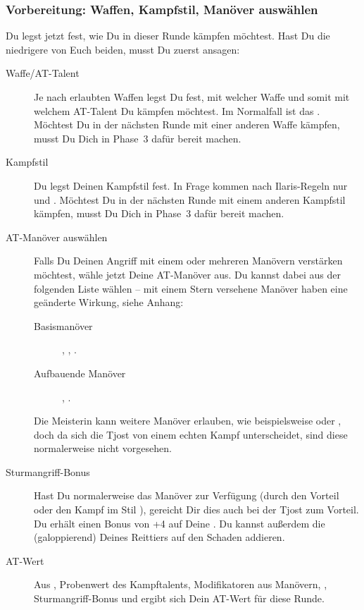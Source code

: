 \documentclass[12pt,div=calc,a5paper,parskip=half]{scrartcl}
\begin{document}
\subsubsection{Vorbereitung: Waffen, Kampfstil, Manöver auswählen}
Du legst jetzt fest, wie Du in dieser Runde kämpfen möchtest. Hast Du die niedrigere  von Euch beiden, musst Du zuerst ansagen: 
\begin{description}
    \item[Waffe/AT-Talent] Je nach erlaubten Waffen legst Du fest, mit welcher Waffe und somit mit welchem AT-Talent Du kämpfen möchtest. Im Normalfall ist das . Möchtest Du in der nächsten Runde mit einer anderen Waffe kämpfen, musst Du Dich in Phase~3 dafür bereit machen. 
    \item[Kampfstil] Du legst Deinen Kampfstil fest. In Frage kommen nach Ilaris-Regeln nur  und . Möchtest Du in der nächsten Runde mit einem anderen Kampfstil kämpfen, musst Du Dich in Phase~3 dafür bereit machen.
    \item[AT-Manöver auswählen] Falls Du Deinen Angriff mit einem oder mehreren Manövern verstärken möchtest, wähle jetzt Deine AT-Manöver aus. Du kannst dabei aus der folgenden Liste wählen -- mit einem Stern versehene Manöver haben eine geänderte Wirkung, siehe Anhang: 
    \begin{description}
        \item[Basismanöver] , , .  
        \item[Aufbauende Manöver] , .
    \end{description}
    Die Meisterin kann weitere Manöver erlauben, wie beispielsweise  oder , doch da sich die Tjost von einem echten Kampf unterscheidet, sind diese normalerweise nicht vorgesehen.  
    \item[Sturmangriff-Bonus] Hast Du normalerweise das Manöver  zur Verfügung (durch den Vorteil  oder den Kampf im Stil ), gereicht Dir dies auch bei der Tjost zum Vorteil. Du erhält einen Bonus von +4 auf Deine . Du kannst außerdem die  (galoppierend) Deines Reittiers auf den Schaden addieren.  
    \item[AT-Wert] Aus , Probenwert des Kampftalents, Modifikatoren aus Manövern, , Sturmangriff-Bonus und \modAT ergibt sich Dein AT-Wert für diese Runde. 

\end{description}
\end{document}
